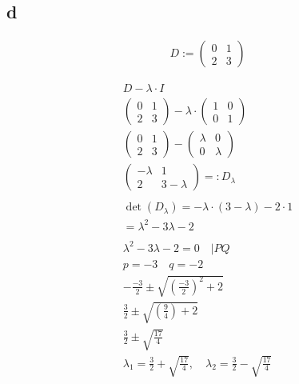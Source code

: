\subsection{d}

\begin{align*}
    D := \begin{pmatrix}
             0 & 1 \\
             2 & 3
         \end{pmatrix}
\end{align*}

\begin{align*}
    D - \lambda \cdot I                                        \\
    \begin{pmatrix}
        0 & 1 \\
        2 & 3
    \end{pmatrix} - \lambda \cdot \begin{pmatrix}
                                      1 & 0 \\
                                      0 & 1
                                  \end{pmatrix}               \\
    \begin{pmatrix}
        0 & 1 \\
        2 & 3
    \end{pmatrix} - \begin{pmatrix}
                        \lambda & 0       \\
                        0       & \lambda
                    \end{pmatrix}                          \\
    \begin{pmatrix}
        -\lambda & 1           \\
        2        & 3 - \lambda
    \end{pmatrix} =: D_\lambda                                 \\\\
    \det(D_\lambda) = -\lambda \cdot (3 - \lambda) - 2 \cdot 1 \\
    = \lambda^2 - 3 \lambda - 2                                \\\\
    \lambda^2 - 3 \lambda - 2 = 0 \quad | PQ                   \\
    p = -3 \quad q = -2                                        \\
    -\frac{-3}{2} \pm \sqrt{\left(\frac{-3}{2}\right)^2 + 2}   \\
    \frac{3}{2} \pm \sqrt{\left(\frac{9}{4}\right) + 2}        \\
    \frac{3}{2} \pm \sqrt{\frac{17}{4}}                        \\
    \lambda_1 = \frac{3}{2} + \sqrt{\frac{17}{4}}, \quad \lambda_2 = \frac{3}{2} - \sqrt{\frac{17}{4}}
\end{align*}

